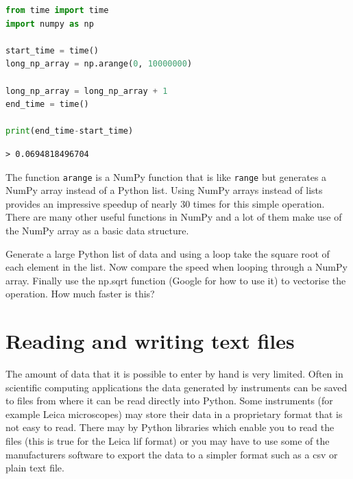 	\begin{lstlisting}[language=Python]
from time import time
import numpy as np

start_time = time()
long_np_array = np.arange(0, 10000000)

long_np_array = long_np_array + 1
end_time = time()

print(end_time-start_time)\end{lstlisting}
	\begin{verbatim}
> 0.0694818496704 \end{verbatim}

	The function \texttt{arange} is a NumPy function that is like \texttt{range} but generates a NumPy array instead of a Python list. Using NumPy arrays instead of lists provides an impressive speedup of nearly 30 times for this simple operation. There are many other useful functions in NumPy and a lot of them make use of the NumPy array as a basic data structure.

\begin{task}Generate a large Python list of data and using a loop take the square root of each element in the list. Now compare the speed when looping through a NumPy array. Finally use the np.sqrt function (Google for how to use it) to vectorise the operation. How much faster is this?\end{task} 

\section{Reading and writing text files}
The amount of data that it is possible to enter by hand is very limited. Often in scientific computing applications the data generated by instruments can be saved to files from where it can be read directly into Python. Some instruments (for example Leica microscopes) may store their data in a proprietary format that is not easy to read. There may by Python libraries which enable you to read the files (this is true for the Leica lif format) or you may have to use some of the manufacturers software to export the data to a simpler format such as a csv or plain text file.
